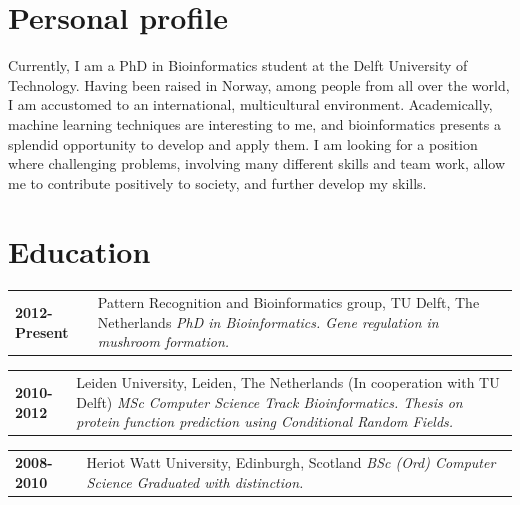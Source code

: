 \documentclass[letterpaper, 10pt]{article} %
\newcommand{\nsection}[1]{
    \section*{\color{MidnightBlue}#1}
  \vspace{-1mm}
}
\newcommand{\entry}[3]{
  \noindent
  \begin{tabular}[t]{p{0.2\textwidth}|p{0.8\textwidth}}
    \textbf{\color{BrickRed}#1} & {#2 \textit{#3}} \\
  \end{tabular}
  \vspace{-2mm}
}
\begin{document}

\nsection{Personal profile}
  \label{sec:persprof}

  Currently, I am a PhD in Bioinformatics student at the Delft University of Technology.
  Having been raised in Norway, among people from all over the world, I am accustomed to an international, multicultural environment.
  Academically, machine learning techniques are interesting to me, and bioinformatics presents a splendid opportunity to develop and apply them.
  I am looking for a position where challenging problems, involving many different skills and team work, allow me to contribute positively to society, and further develop my skills.


\nsection{Education}
  \label{sec:education}

  \entry{2012-Present}
        {Pattern Recognition and Bioinformatics group, TU Delft, The Netherlands \newline}
        {PhD in Bioinformatics. \newline
         Gene regulation in mushroom formation.
         \newline}

  \entry{2010-2012}
        {Leiden University, Leiden, The Netherlands (In cooperation with TU Delft) \newline}
        {MSc Computer Science Track Bioinformatics. \newline
         Thesis on protein function prediction using Conditional Random Fields.
         \newline}

  \entry{2008-2010}
        {Heriot Watt University, Edinburgh, Scotland \newline}
        {BSc (Ord) Computer Science \newline
         Graduated with distinction.
         }

\end{document}
